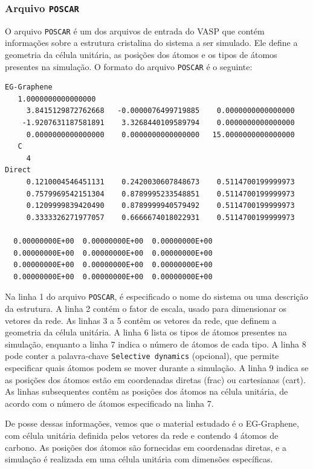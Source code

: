 \subsubsection{Arquivo \texttt{POSCAR}}
O arquivo \texttt{POSCAR} é um dos arquivos de entrada do VASP que contém informações sobre a estrutura
cristalina do sistema a ser simulado. Ele define a geometria da célula unitária, as posições dos
átomos e os tipos de átomos presentes na simulação. O formato do arquivo \texttt{POSCAR} é o seguinte:

\begin{verbatim}
EG-Graphene                             
   1.0000000000000000     
     3.8415129872762668   -0.0000076499719885    0.0000000000000000
    -1.9207631187581891    3.3268440109589794    0.0000000000000000
     0.0000000000000000    0.0000000000000000   15.0000000000000000
   C 
     4
Direct
     0.1210004546451131    0.2420030607848673    0.5114700199999973
     0.7579969542151304    0.8789995233548851    0.5114700199999973
     0.1209999839420490    0.8789999940579492    0.5114700199999973
     0.3333326271977057    0.6666674018022931    0.5114700199999973

  0.00000000E+00  0.00000000E+00  0.00000000E+00
  0.00000000E+00  0.00000000E+00  0.00000000E+00
  0.00000000E+00  0.00000000E+00  0.00000000E+00
  0.00000000E+00  0.00000000E+00  0.00000000E+00
\end{verbatim}

Na linha 1 do arquivo \texttt{POSCAR}, é especificado o nome do sistema ou uma descrição da
estrutura. A linha 2 contém o fator de escala, usado para dimensionar os vetores da rede. As
linhas 3 a 5 contêm os vetores da rede, que definem a geometria da célula unitária. A linha 6 lista
os tipos de átomos presentes na simulação, enquanto a linha 7 indica o número de átomos de cada
tipo. A linha 8 pode conter a palavra-chave \texttt{Selective dynamics} (opcional), que permite
especificar quais átomos podem se mover durante a simulação. A linha 9 indica se as posições dos
átomos estão em coordenadas diretas (frac) ou cartesianas (cart). As linhas subsequentes contêm as
posições dos átomos na célula unitária, de acordo com o número de átomos especificado na linha 7.

De posse dessas informações, vemos que o material estudado é o EG-Graphene, com célula unitária
definida pelos vetores da rede e contendo 4 átomos de carbono. As posições dos átomos são fornecidas
em coordenadas diretas, e a simulação é realizada em uma célula unitária com dimensões específicas.

